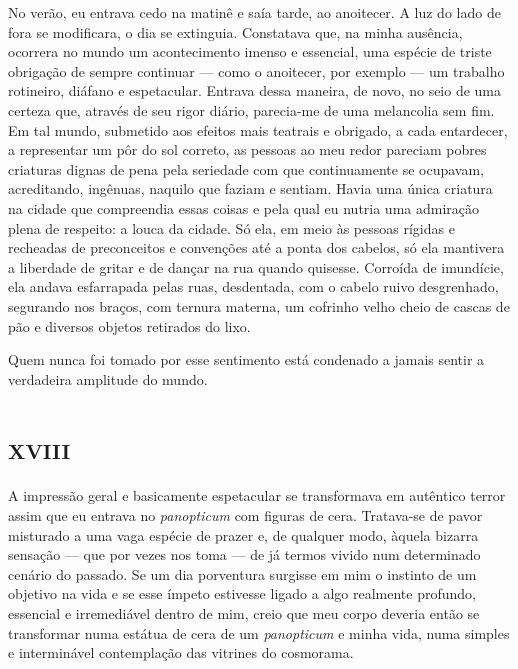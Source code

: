 \vspace*{-\baselineskip}

No verão, eu entrava cedo na matinê e saía tarde, ao anoitecer. A luz do lado de fora se modificara, o dia se extinguia. Constatava que, na minha ausência, ocorrera no mundo um acontecimento imenso e essencial, uma espécie de triste obrigação de sempre continuar --- como o anoitecer, por exemplo --- um trabalho rotineiro, diáfano e espetacular. Entrava dessa maneira, de novo, no seio de uma certeza que, através de seu rigor diário, parecia-me de uma melancolia sem fim. Em tal mundo, submetido aos efeitos mais teatrais e obrigado, a cada entardecer, a representar um pôr do sol correto, as pessoas ao meu redor pareciam pobres criaturas dignas de pena pela seriedade com que continuamente se ocupavam, acreditando, ingênuas, naquilo que faziam e sentiam. Havia uma única criatura na cidade que compreendia essas coisas e pela qual eu nutria uma admiração plena de respeito: a louca da cidade. Só ela, em meio às pessoas rígidas e recheadas de preconceitos e convenções até a ponta dos cabelos, só ela mantivera a liberdade de gritar e de dançar na rua quando quisesse. Corroída de imundície, ela andava esfarrapada pelas ruas, desdentada, com o cabelo ruivo desgrenhado, segurando nos braços, com ternura materna, um cofrinho velho cheio de cascas de pão e diversos objetos retirados do lixo.


Quem nunca foi tomado por esse sentimento está condenado a jamais sentir a verdadeira amplitude do mundo.


\chapter*{\huge\centering\textsc{xviii}}

A impressão geral e basicamente espetacular se transformava em autêntico terror assim que eu entrava no \textit{panopticum} com figuras de cera.  Tratava-se de pavor misturado a uma vaga espécie de prazer e, de qualquer modo, àquela bizarra sensação --- que por vezes nos toma --- de já termos vivido num determinado cenário do passado. Se um dia porventura surgisse em mim o instinto de um objetivo na vida e se esse ímpeto estivesse ligado a algo realmente profundo, essencial e irremediável dentro de mim, creio que meu corpo deveria então se transformar numa estátua de cera de um \textit{panopticum} e minha vida, numa simples e interminável contemplação das vitrines do cosmorama.

